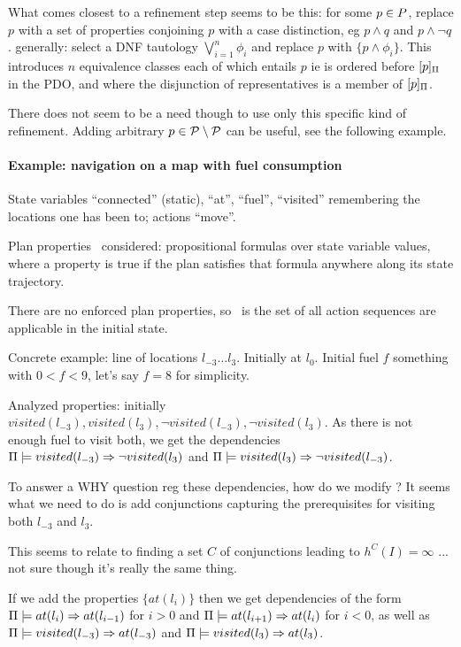 What comes closest to a refinement step seems to be this: for some $p
\in P$, replace $p$ with a set of properties conjoining $p$ with
a case distinction, eg $p \wedge q$ and $p \wedge \neg q$. generally:
select a DNF tautology $\bigvee_{i=1}^n \phi_i$ and replace $p$ with
$\{p \wedge \phi_i\}$. This introduces $n$ equivalence classes each of
which entails $p$ ie is ordered before $[p]_{\Pi}$ in the
PDO, and where the disjunction of representatives is a member of
$[p]_{\Pi}$.

There does not seem to be a need though to use only this specific kind
of refinement. Adding arbitrary $p \in \cal P \setminus P$
can be useful, see the following example.



\paragraph{Example: navigation on a map with fuel consumption}

State variables ``connected'' (static), ``at'', ``fuel'', ``visited''
remembering the locations one has been to; actions ``move''.

Plan properties \candprops\ considered: propositional formulas over
state variable values, where a property is true if the plan satisfies
that formula anywhere along its state trajectory.

There are no enforced plan properties, so \plans\ is the set of all
action sequences are applicable in the initial state.

Concrete example: line of locations $l_{-3} ... l_3$. Initially at
$l_0$. Initial fuel $f$ something with $0 < f < 9$, let's say $f = 8$
for simplicity.

Analyzed properties: initially $visited(l_{-3}), visited(l_3), \neg
visited(l_{-3}), \neg visited(l_3)$. As there is not enough fuel to
visit both, we get the dependencies
$\Pi \models visited(l_{-3}) \Rightarrow \neg visited(l_3)$ and
$\Pi \models visited(l_3) \Rightarrow \neg visited(l_{-3})$. 

To answer a WHY question reg these dependencies, how do we modify
\props? It seems what we need to do is add conjunctions capturing the
prerequisites for visiting both $l_{-3}$ and $l_3$. 

This seems to relate to finding a set $C$ of conjunctions leading to
$h^C(I) = \infty$ ... not sure though it's really the same thing.

If we add the properties $\{at(l_i)\}$ then we get dependencies of the
form $\Pi \models at(l_i) \Rightarrow at(l_{i-1})$ for $i > 0$ and
$\Pi \models at(l_{i+1}) \Rightarrow at(l_{i})$ for $i < 0$, as well as
$\Pi \models visited(l_{-3}) \Rightarrow at(l_{-3})$ and
$\Pi \models visited(l_{3}) \Rightarrow at(l_{3})$.

